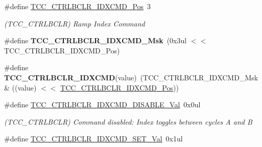 \begin{DoxyCompactItemize}
\item 
\hypertarget{group___s_a_m_l21___t_c_c_gabddca25dc97286079867b1f3714bb494}{}\#define \hyperlink{group___s_a_m_l21___t_c_c_gabddca25dc97286079867b1f3714bb494}{T\+C\+C\+\_\+\+C\+T\+R\+L\+B\+C\+L\+R\+\_\+\+I\+D\+X\+C\+M\+D\+\_\+\+Pos}~3\label{group___s_a_m_l21___t_c_c_gabddca25dc97286079867b1f3714bb494}

\begin{DoxyCompactList}\small\item\em (T\+C\+C\+\_\+\+C\+T\+R\+L\+B\+C\+L\+R) Ramp Index Command \end{DoxyCompactList}\item 
\hypertarget{group___s_a_m_l21___t_c_c_gaccc5c8cd32202ca29ad08252676b03e7}{}\#define {\bfseries T\+C\+C\+\_\+\+C\+T\+R\+L\+B\+C\+L\+R\+\_\+\+I\+D\+X\+C\+M\+D\+\_\+\+Msk}~(0x3ul $<$$<$ T\+C\+C\+\_\+\+C\+T\+R\+L\+B\+C\+L\+R\+\_\+\+I\+D\+X\+C\+M\+D\+\_\+\+Pos)\label{group___s_a_m_l21___t_c_c_gaccc5c8cd32202ca29ad08252676b03e7}

\item 
\hypertarget{group___s_a_m_l21___t_c_c_gaa607e81d00c0f7a6a3ec6b8feeacd29c}{}\#define {\bfseries T\+C\+C\+\_\+\+C\+T\+R\+L\+B\+C\+L\+R\+\_\+\+I\+D\+X\+C\+M\+D}(value)~(T\+C\+C\+\_\+\+C\+T\+R\+L\+B\+C\+L\+R\+\_\+\+I\+D\+X\+C\+M\+D\+\_\+\+Msk \& ((value) $<$$<$ \hyperlink{group___s_a_m_l21___t_c_c_gabddca25dc97286079867b1f3714bb494}{T\+C\+C\+\_\+\+C\+T\+R\+L\+B\+C\+L\+R\+\_\+\+I\+D\+X\+C\+M\+D\+\_\+\+Pos}))\label{group___s_a_m_l21___t_c_c_gaa607e81d00c0f7a6a3ec6b8feeacd29c}

\item 
\hypertarget{group___s_a_m_l21___t_c_c_ga4c9b8c8579bc22e765c00e030f6e6b66}{}\#define \hyperlink{group___s_a_m_l21___t_c_c_ga4c9b8c8579bc22e765c00e030f6e6b66}{T\+C\+C\+\_\+\+C\+T\+R\+L\+B\+C\+L\+R\+\_\+\+I\+D\+X\+C\+M\+D\+\_\+\+D\+I\+S\+A\+B\+L\+E\+\_\+\+Val}~0x0ul\label{group___s_a_m_l21___t_c_c_ga4c9b8c8579bc22e765c00e030f6e6b66}

\begin{DoxyCompactList}\small\item\em (T\+C\+C\+\_\+\+C\+T\+R\+L\+B\+C\+L\+R) Command disabled\+: Index toggles between cycles A and B \end{DoxyCompactList}\item 
\hypertarget{group___s_a_m_l21___t_c_c_ga824d45cd52b2067884713412f9cc95ef}{}\#define \hyperlink{group___s_a_m_l21___t_c_c_ga824d45cd52b2067884713412f9cc95ef}{T\+C\+C\+\_\+\+C\+T\+R\+L\+B\+C\+L\+R\+\_\+\+I\+D\+X\+C\+M\+D\+\_\+\+S\+E\+T\+\_\+\+Val}~0x1ul\label{group___s_a_m_l21___t_c_c_ga824d45cd52b2067884713412f9cc95ef}


\end{DoxyCompactItemize}
